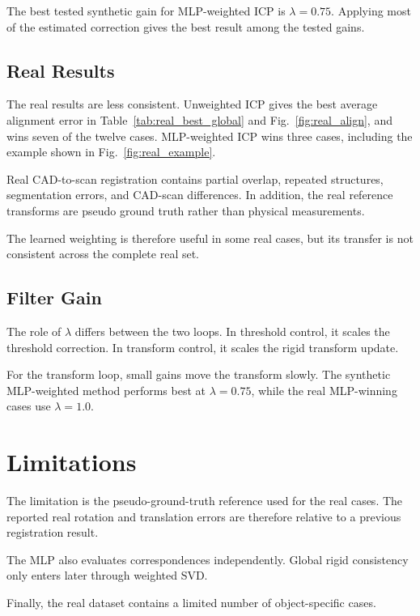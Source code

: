 \documentclass[conference]{IEEEtran}
\begin{document}
The best tested synthetic gain for MLP-weighted ICP is $\lambda=0.75$. Applying most of the estimated correction gives the best result among the tested gains.

\subsection{Real Results}
\label{subsec:real_discussion}

The real results are less consistent. Unweighted ICP gives the best average alignment error in Table~\ref{tab:real_best_global} and Fig.~\ref{fig:real_align}, and wins seven of the twelve cases. MLP-weighted ICP wins three cases, including the example shown in Fig.~\ref{fig:real_example}.

Real CAD-to-scan registration contains partial overlap, repeated structures, segmentation errors, and CAD-scan differences. In addition, the real reference transforms are pseudo ground truth rather than physical measurements.

The learned weighting is therefore useful in some real cases, but its transfer is not consistent across the complete real set.

\subsection{Filter Gain}
\label{subsec:lambda_discussion}

The role of $\lambda$ differs between the two loops. In threshold control, it scales the threshold correction. In transform control, it scales the rigid transform update.

For the transform loop, small gains move the transform slowly. The synthetic MLP-weighted method performs best at $\lambda=0.75$, while the real MLP-winning cases use $\lambda=1.0$.

\section{Limitations}
\label{sec:limitations}

The limitation is the pseudo-ground-truth reference used for the real cases. The reported real rotation and translation errors are therefore relative to a previous registration result.

The MLP also evaluates correspondences independently. Global rigid consistency only enters later through weighted SVD.

Finally, the real dataset contains a limited number of object-specific cases.
\end{document}

